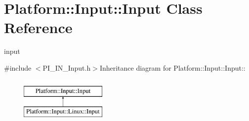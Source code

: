 \hypertarget{classPlatform_1_1Input_1_1Input}{
\section{Platform::Input::Input Class Reference}
\label{classPlatform_1_1Input_1_1Input}
}


input  


{\ttfamily \#include $<$PI\_\-IN\_\-Input.h$>$}Inheritance diagram for Platform::Input::Input::\begin{figure}[H]
\begin{center}
\leavevmode
\includegraphics[height=2cm]{classPlatform_1_1Input_1_1Input}
\end{center}
\end{figure}
